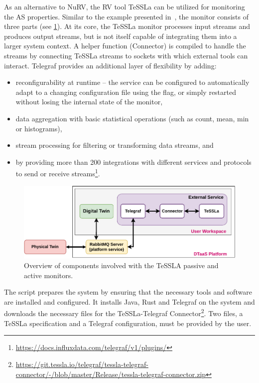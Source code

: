 As an alternative to NuRV, the RV tool TeSSLa can be utilized for monitoring the AS properties.
Similar to the example presented in~\cite{TT-Connector}, the monitor consists of three parts (see \cref{fig:architecture-diagram}).
At its core, the TeSSLa monitor processes input streams and produces output streams, but is not itself capable of integrating them into a larger system context.
A helper function (Connector) is compiled to handle the streams by connecting TeSSLa streams to sockets with which external tools can interact.
Telegraf provides an additional layer of flexibility by adding:
\begin{itemize}
	\item reconfigurability at runtime -- the service can be configured to automatically adapt to a changing configuration file using the  flag, or simply restarted without losing the internal state of the monitor,
	\item data aggregation with basic statistical operations (such as count, mean, min or histograms),
	\item stream processing for filtering or transforming data streams, and
	\item by providing more than 200 integrations with different services and protocols to send or receive streams\footnote{\url{https://docs.influxdata.com/telegraf/v1/plugins/}}.
\end{itemize}%
%
\begin{figure}[tbp]
	\centering
	\includegraphics[width=\columnwidth]{images/TeSSLa-integration.pdf}
	\caption{Overview of components involved with the TeSSLA passive and active monitors.}
	\label{fig:architecture-diagram}
\end{figure}%
%
The  script prepares the system by ensuring that the necessary tools and software are installed and configured.
It installs Java, Rust and Telegraf on the system and downloads the necessary files for the TeSSLa-Telegraf Connector\footnote{\url{https://git.tessla.io/telegraf/tessla-telegraf-connector/-/blob/master/Release/tessla-telegraf-connector.zip}}. Two files, a TeSSLa specification and a Telegraf configuration, must be provided by the user.

